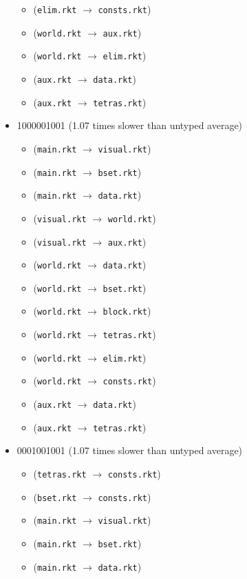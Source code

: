 \documentclass{article}
\newcommand{\mono}[1]{\texttt{#1}}
\begin{document}
\begin{itemize}
\begin{itemize}
  \item (\mono{elim.rkt} $\rightarrow$ \mono{consts.rkt})
  \item (\mono{world.rkt} $\rightarrow$ \mono{aux.rkt})
  \item (\mono{world.rkt} $\rightarrow$ \mono{elim.rkt})
  \item (\mono{aux.rkt} $\rightarrow$ \mono{data.rkt})
  \item (\mono{aux.rkt} $\rightarrow$ \mono{tetras.rkt})
  \end{itemize}
\item 1000001001 (1.07 times slower than untyped average)
  \begin{itemize}
  \item (\mono{main.rkt} $\rightarrow$ \mono{visual.rkt})
  \item (\mono{main.rkt} $\rightarrow$ \mono{bset.rkt})
  \item (\mono{main.rkt} $\rightarrow$ \mono{data.rkt})
  \item (\mono{visual.rkt} $\rightarrow$ \mono{world.rkt})
  \item (\mono{visual.rkt} $\rightarrow$ \mono{aux.rkt})
  \item (\mono{world.rkt} $\rightarrow$ \mono{data.rkt})
  \item (\mono{world.rkt} $\rightarrow$ \mono{bset.rkt})
  \item (\mono{world.rkt} $\rightarrow$ \mono{block.rkt})
  \item (\mono{world.rkt} $\rightarrow$ \mono{tetras.rkt})
  \item (\mono{world.rkt} $\rightarrow$ \mono{elim.rkt})
  \item (\mono{world.rkt} $\rightarrow$ \mono{consts.rkt})
  \item (\mono{aux.rkt} $\rightarrow$ \mono{data.rkt})
  \item (\mono{aux.rkt} $\rightarrow$ \mono{tetras.rkt})
  \end{itemize}
\item 0001001001 (1.07 times slower than untyped average)
  \begin{itemize}
  \item (\mono{tetras.rkt} $\rightarrow$ \mono{consts.rkt})
  \item (\mono{bset.rkt} $\rightarrow$ \mono{consts.rkt})
  \item (\mono{main.rkt} $\rightarrow$ \mono{visual.rkt})
  \item (\mono{main.rkt} $\rightarrow$ \mono{bset.rkt})
  \item (\mono{main.rkt} $\rightarrow$ \mono{data.rkt})

\end{itemize}
\end{itemize}
\end{document}
